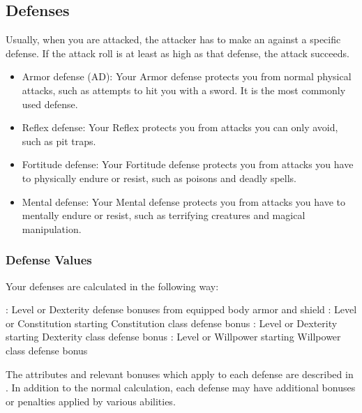     \subsection{Defenses}\label{Defenses}
        Usually, when you are attacked, the attacker has to make an  against a specific defense.
        If the attack roll is at least as high as that defense, the attack succeeds.
        \begin{itemize}
            \item Armor defense (AD): Your Armor defense protects you from normal physical attacks, such as attempts to hit you with a sword.
                It is the most commonly used defense.
            \item Reflex defense: Your Reflex protects you from attacks you can only avoid, such as pit traps.
            \item Fortitude defense: Your Fortitude defense protects you from attacks you have to physically endure or resist, such as poisons and deadly spells.
            \item Mental defense: Your Mental defense protects you from attacks you have to mentally endure or resist, such as terrifying creatures and magical manipulation.
        \end{itemize}

        \subsubsection{Defense Values}\label{Defense Values}

            Your defenses are calculated in the following way:
            \begin{itemize}
                : Level or Dexterity \add defense bonuses from equipped body armor and shield
                : Level or Constitution \add starting Constitution \add class defense bonus
                : Level or Dexterity \add starting Dexterity \add class defense bonus
                : Level or Willpower \add starting Willpower \add class defense bonus
            \end{itemize}
            The attributes and relevant bonuses which apply to each defense are described in .
            In addition to the normal calculation, each defense may have additional bonuses or penalties applied by various abilities.

